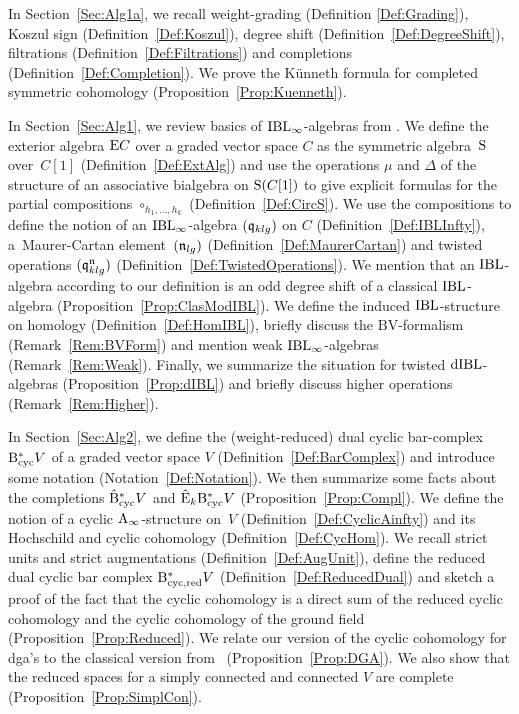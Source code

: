 \documentclass[\MainFolder/Text.tex]{subfiles}
\begin{document}
\label{Sec:Alg0}

In Section~\ref{Sec:Alg1a}, we recall weight-grading (Definition \ref{Def:Grading}), Koszul sign (Definition~\ref{Def:Koszul}), degree shift (Definition~\ref{Def:DegreeShift}), filtrations (Definition~\ref{Def:Filtrations}) and completions (Definition~\ref{Def:Completion}). We prove the K\"unneth formula for completed symmetric cohomology (Proposition~\ref{Prop:Kuenneth}).

In Section~\ref{Sec:Alg1}, we review basics of $\mathrm{IBL}_\infty$-algebras from \cite{Cieliebak2015}. We define the exterior algebra $\mathrm{E} C$ over a graded vector space $C$ as the symmetric algebra~$\mathrm{S}$ over~$C[1]$ (Definition~\ref{Def:ExtAlg}) and use the operations $\mu$ and $\Delta$ of the structure of an associative bialgebra on $\mathrm{S}(C[1])$ to give explicit formulas for the partial compositions $\circ_{h_1, \dotsc, h_k}$  (Definition~\ref{Def:CircS}). We use the compositions to define the notion of an $\mathrm{IBL}_\infty$-algebra $(\mathfrak{q}_{klg})$ on $C$ (Definition~\ref{Def:IBLInfty}), a~Maurer-Cartan element~$(\mathfrak{n}_{lg})$ (Definition~\ref{Def:MaurerCartan}) and twisted operations $(\mathfrak{q}_{klg}^{\mathfrak{n}})$ (Definition~\ref{Def:TwistedOperations}). We mention that an $\mathrm{IBL}$-algebra according to our definition is an odd degree shift of a classical $\mathrm{IBL}$-algebra (Proposition~\ref{Prop:ClasModIBL}). We define the induced $\mathrm{IBL}$-structure on homology (Definition~\ref{Def:HomIBL}), briefly discuss the $\mathrm{BV}$-formalism (Remark~\ref{Rem:BVForm}) and mention weak $\mathrm{IBL}_\infty$-algebras (Remark~\ref{Rem:Weak}). Finally, we summarize the situation for twisted $\mathrm{dIBL}$-algebras (Proposition~\ref{Prop:dIBL}) and briefly discuss higher operations (Remark~\ref{Rem:Higher}).

In Section~\ref{Sec:Alg2}, we define the (weight-reduced) dual cyclic bar-complex $\mathrm{B}_{\mathrm{cyc}}^* V$ of a graded vector space $V$ (Definition~\ref{Def:BarComplex}) and introduce some notation (Notation~\ref{Def:Notation}). We then summarize some facts about the completions $\hat{\mathrm{B}}_{\mathrm{cyc}}^* V$ and $\hat{\mathrm{E}}_k \mathrm{B}_{\mathrm{cyc}}^* V$ (Proposition~\ref{Prop:Compl}). We define the notion of a cyclic $\mathrm{A}_\infty$-structure on~$V$ (Definition~\ref{Def:CyclicAinfty}) and its Hochschild and cyclic cohomology (Definition~\ref{Def:CycHom}). We recall strict units and strict augmentations (Definition~\ref{Def:AugUnit}), define the reduced dual cyclic bar complex $\mathrm{B}_{\mathrm{cyc},\mathrm{red}}^* V$ (Definition~\ref{Def:ReducedDual}) and sketch a proof of the fact that the cyclic cohomology is a direct sum of the reduced cyclic cohomology and the cyclic cohomology of the ground field (Proposition~\ref{Prop:Reduced}). We relate our version of the cyclic cohomology for dga's to the classical version from~\cite{LodayCyclic} (Proposition~\ref{Prop:DGA}). We also show that the reduced spaces for a simply connected and connected $V$ are complete (Proposition~\ref{Prop:SimplCon}).
\end{document}
